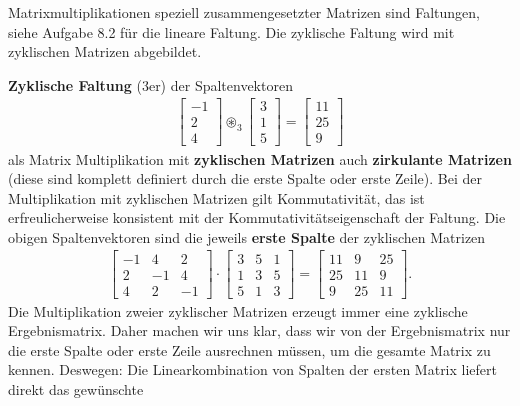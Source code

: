 \newpage
\begin{ExCalc}
Matrixmultiplikationen speziell zusammengesetzter Matrizen sind Faltungen, siehe
Aufgabe 8.2 für die lineare Faltung.
Die zyklische Faltung wird mit zyklischen Matrizen abgebildet.

\textbf{Zyklische Faltung} (3er) der Spaltenvektoren
\begin{align}
\begin{bmatrix}
-1\\2\\4
\end{bmatrix}
\circledast_3
\begin{bmatrix}
3\\1\\5
\end{bmatrix}
=
\begin{bmatrix}
11\\25\\9
\end{bmatrix}
\end{align}
als Matrix Multiplikation mit \textbf{zyklischen Matrizen} auch \textbf{zirkulante Matrizen}
(diese sind komplett definiert durch die erste Spalte oder erste Zeile).
Bei der Multiplikation mit zyklischen Matrizen gilt Kommutativität, das ist erfreulicherweise
konsistent mit der Kommutativitätseigenschaft der Faltung.
%
Die obigen Spaltenvektoren sind die jeweils \textbf{erste Spalte} der zyklischen Matrizen
\begin{align}
\begin{bmatrix}
-1 &  4 &  2\\
 2 & -1 &  4\\
 4 &  2 & -1
\end{bmatrix}
\cdot
\begin{bmatrix}
3 & 5 & 1\\
1 & 3 & 5\\
5 & 1 & 3
\end{bmatrix}
=
\begin{bmatrix}
11  &   9  &  25\\
25  &  11  &  9\\
 9  &  25  &  11
\end{bmatrix}.
\end{align}
%
Die Multiplikation zweier zyklischer Matrizen erzeugt immer eine zyklische Ergebnismatrix.
Daher machen wir uns klar, dass wir von der Ergebnismatrix nur die erste Spalte
oder erste Zeile ausrechnen müssen, um die gesamte Matrix zu kennen.
%
Deswegen: Die Linearkombination von Spalten der ersten Matrix liefert direkt das gewünschte

\end{ExCalc}
